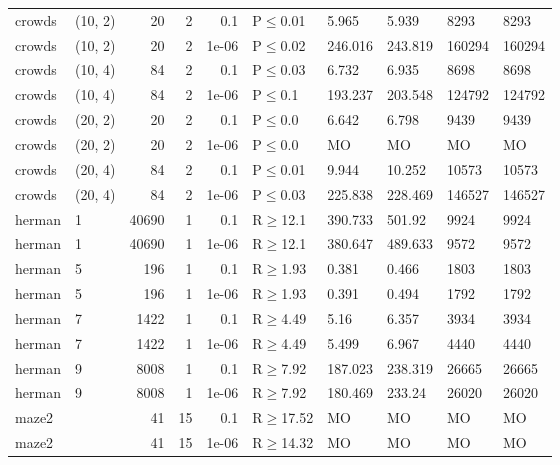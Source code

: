 \begin{longtable}{llrrrlllll}
 crowds        & (10, 2)   &     	20 &   2 & 0.1   & P$\leq$0.01  & 5.965    & 5.939    & 8293    & 8293    \\
 crowds        & (10, 2)   &     	20 &   2 & 1e-06 & P$\leq$0.02  & 246.016  & 243.819  & 160294  & 160294  \\
 crowds        & (10, 4)   &     	84 &   2 & 0.1   & P$\leq$0.03  & 6.732    & 6.935    & 8698    & 8698    \\
 crowds        & (10, 4)   &     	84 &   2 & 1e-06 & P$\leq$0.1   & 193.237  & 203.548  & 124792  & 124792  \\
 crowds        & (20, 2)   &     	20 &   2 & 0.1   & P$\leq$0.0   & 6.642    & 6.798    & 9439    & 9439    \\
 crowds        & (20, 2)   &     	20 &   2 & 1e-06 & P$\leq$0.0   & MO       & MO       & MO      & MO      \\
 crowds        & (20, 4)   &     	84 &   2 & 0.1   & P$\leq$0.01  & 9.944    & 10.252   & 10573   & 10573   \\
 crowds        & (20, 4)   &     	84 &   2 & 1e-06 & P$\leq$0.03  & 225.838  & 228.469  & 146527  & 146527  \\
 herman        & 1         &  	40690 &   1 & 0.1   & R$\geq$12.1  & 390.733  & 501.92   & 9924    & 9924    \\
 herman        & 1         &  	40690 &   1 & 1e-06 & R$\geq$12.1  & 380.647  & 489.633  & 9572    & 9572    \\
 herman        & 5         &    	196 &   1 & 0.1   & R$\geq$1.93  & 0.381    & 0.466    & 1803    & 1803    \\
 herman        & 5         &    	196 &   1 & 1e-06 & R$\geq$1.93  & 0.391    & 0.494    & 1792    & 1792    \\
 herman        & 7         &   	1422 &   1 & 0.1   & R$\geq$4.49  & 5.16     & 6.357    & 3934    & 3934    \\
 herman        & 7         &   	1422 &   1 & 1e-06 & R$\geq$4.49  & 5.499    & 6.967    & 4440    & 4440    \\
 herman        & 9         &   	8008 &   1 & 0.1   & R$\geq$7.92  & 187.023  & 238.319  & 26665   & 26665   \\
 herman        & 9         &   	8008 &   1 & 1e-06 & R$\geq$7.92  & 180.469  & 233.24   & 26020   & 26020   \\
 maze2         &           &     	41 &  15 & 0.1   & R$\geq$17.52 & MO       & MO       & MO      & MO      \\
 maze2         &           &     	41 &  15 & 1e-06 & R$\geq$14.32 & MO       & MO       & MO      & MO      \\

\end{longtable}
